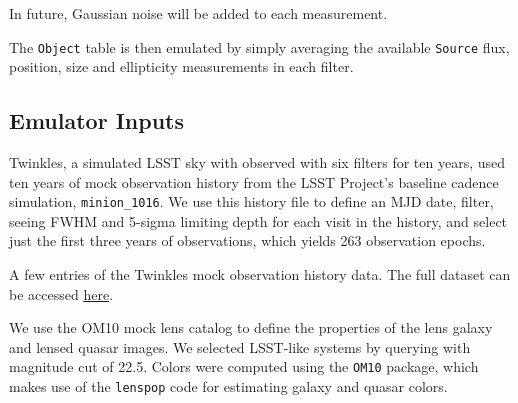 \documentclass[\docopts]{\docclass}
\def\Object{\texttt{Object}\xspace}
\def\Source{\texttt{Source}\xspace}
\begin{document}
In future, Gaussian noise will be added to each measurement.

The \Object table is then emulated by simply averaging the available
\Source flux, position, size and ellipticity measurements in each
filter.


\subsection{Emulator Inputs}
\label{subsec:inputs}

Twinkles, a simulated LSST sky with observed with six filters for ten
years, used ten years of mock observation history from the LSST
Project's baseline cadence simulation, \texttt{minion\_1016}. We use
this history file to define an MJD date, filter, seeing FWHM and 5-sigma
limiting depth for each visit in the history, and select just the first
three years of observations, which yields 263 observation epochs.

\begin{table}[!h]
%
\caption{A few entries of the Twinkles mock observation history data.
The full dataset can be accessed
\href{https://github.com/LSSTDESC/SLRealizer/blob/master/data/twinkles_observation_history.csv}{here}.}
\end{table}

We use the OM10 mock lens catalog \citep{OM10} to define the properties
of the lens galaxy and lensed quasar images. We selected LSST-like
systems by querying with magnitude cut of 22.5. Colors were computed
using the \texttt{OM10} package, which makes use of the \texttt{lenspop}
code \citep{lenspop} for estimating galaxy and quasar colors.
\end{document}
